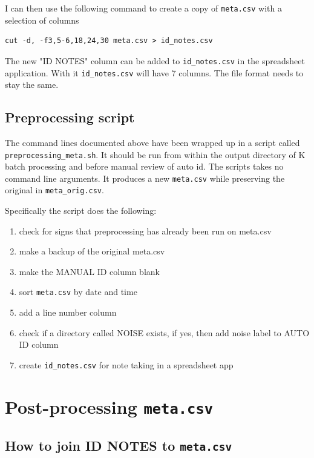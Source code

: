 \documentclass[English, 11pt, twoside, authoryear]{article}
\begin{document}
I can then use the following command to create a copy of \texttt{meta.csv} with a selection of columns
\begin{lstlisting}[numbers=none]
cut -d, -f3,5-6,18,24,30 meta.csv > id_notes.csv
\end{lstlisting}

The new "ID NOTES" column can be added to \texttt{id\_notes.csv} in the spreadsheet application. With it \texttt{id\_notes.csv} will have 7 columns. The file format needs to stay the same.

%
%
\subsection{Preprocessing script}
%
%

The command lines documented above have been wrapped up in a script called \texttt{preprocessing\_meta.sh}. It should be run from within the output directory of \textsf{K} batch processing and before manual review of auto id. The scripts takes no command line arguments.
It produces a new \texttt{meta.csv} while preserving the original in \texttt{meta\_orig.csv}.

Specifically the script does the following:
\begin{enumerate}
\item check for signs that preprocessing has already been run on meta.csv
\item make a backup of the original meta.csv
\item make the MANUAL ID column blank
\item sort \texttt{meta.csv} by date and time
\item add a line number column
\item check if a directory called NOISE exists, if yes, then add noise label to AUTO ID column
\item create \texttt{id\_notes.csv} for note taking in a spreadsheet app
\end{enumerate}


%
%
%
\section{Post-processing \texttt{meta.csv}}
%
%
%

%
%
\subsection{How to join ID NOTES to \texttt{meta.csv}}
%
%
\end{document}
